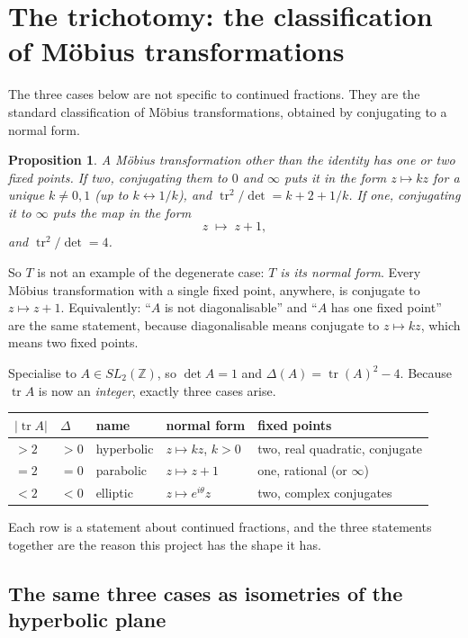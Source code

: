 \documentclass[12pt,a4paper]{article}
\theoremstyle{plain}
\newtheorem{proposition}[theorem]{Proposition}
\theoremstyle{definition}
\newcommand{\tr}{\operatorname{tr}}
\begin{document}
\section{The trichotomy: the classification of M\"obius transformations}

The three cases below are not specific to continued fractions. They are the standard classification of M\"obius transformations, obtained by conjugating to a normal form.

\begin{proposition}\label{normal}
A M\"obius transformation other than the identity has one or two fixed points. If two, conjugating them to $0$ and $\infty$ puts it in the form $z \mapsto kz$ for a unique $k \neq 0,1$ (up to $k \leftrightarrow 1/k$), and $\tr^2/\det = k + 2 + 1/k$. If one, conjugating it to $\infty$ puts the map in the form
\[
  z \;\longmapsto\; z+1 ,
\]
and $\tr^2/\det = 4$.
\end{proposition}

So $T$ is not an example of the degenerate case: \emph{$T$ is its normal form}. Every M\"obius transformation with a single fixed point, anywhere, is conjugate to $z\mapsto z+1$. Equivalently: ``$A$ is not diagonalisable'' and ``$A$ has one fixed point'' are the same statement, because diagonalisable means conjugate to $z\mapsto kz$, which means two fixed points.

Specialise to $A \in SL_2(\mathbb{Z})$, so $\det A = 1$ and $\Delta(A) = \tr(A)^2-4$. Because $\tr A$ is now an \emph{integer}, exactly three cases arise.

\begin{center}
\begin{tabular}{lllll}
\toprule
$|\tr A|$ & $\Delta$ & name & normal form & fixed points \\
\midrule
$>2$ & $>0$ & hyperbolic & $z \mapsto kz$, $k>0$ & two, real quadratic, conjugate \\
$=2$ & $=0$ & parabolic  & $z \mapsto z+1$ & one, rational (or $\infty$) \\
$<2$ & $<0$ & elliptic   & $z \mapsto e^{i\theta}z$ & two, complex conjugates \\
\bottomrule
\end{tabular}
\end{center}

Each row is a statement about continued fractions, and the three statements together are the reason this project has the shape it has.

\subsection*{The same three cases as isometries of the hyperbolic plane}
\end{document}
